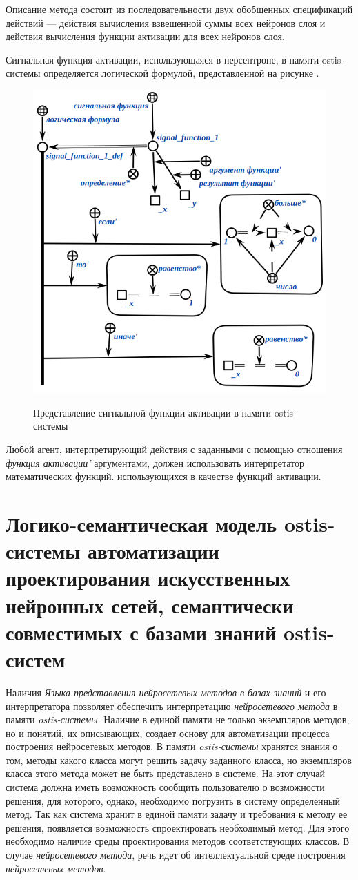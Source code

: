 Описание метода состоит из последовательности двух обобщенных спецификаций действий --- действия вычисления взвешенной суммы всех нейронов слоя и действия вычисления функции активации для всех нейронов слоя.

Сигнальная функция активации, использующаяся в персептроне, в памяти ostis-системы определяется логической формулой, представленной на рисунке \textit{}.

\begin{figure}
	\centering
	\caption{Представление сигнальной функции активации в памяти ostis-системы}
	\includegraphics[width=0.5\linewidth]{author/part3/figures/signal_function_def.png}
	\label{fig:signal_function_def}
\end{figure}

Любой агент, интерпретирующий действия с заданными с помощью отношения \textit{функция активации'} аргументами, должен использовать интерпретатор математических функций. использующихся в качестве функций активации.


\section{Логико-семантическая модель ostis-системы автоматизации проектирования искусственных нейронных сетей, семантически совместимых с базами знаний ostis-систем}
\label{sec_chapter_ann_framework}

Наличия \textit{Языка представления нейросетевых методов в базах знаний} и его интерпретатора позволяет обеспечить интерпретацию \textit{нейросетевого метода} в памяти \textit{ostis-системы}. Наличие в единой памяти не только экземпляров методов, но и понятий, их описывающих, создает основу для автоматизации процесса построения нейросетевых методов. В памяти \textit{ostis-системы} хранятся знания о том, методы какого класса могут решить задачу заданного класса, но экземпляров класса этого метода может не быть представлено в системе. На этот случай система должна иметь возможность сообщить пользователю о возможности решения, для которого, однако, необходимо погрузить в систему определенный метод. Так как система хранит в единой памяти задачу и требования к методу ее решения, появляется возможность спроектировать необходимый метод. Для этого необходимо наличие среды проектирования методов соответствующих классов. В случае \textit{нейросетевого метода}, речь идет об интеллектуальной среде построения \textit{нейросетевых методов}.

